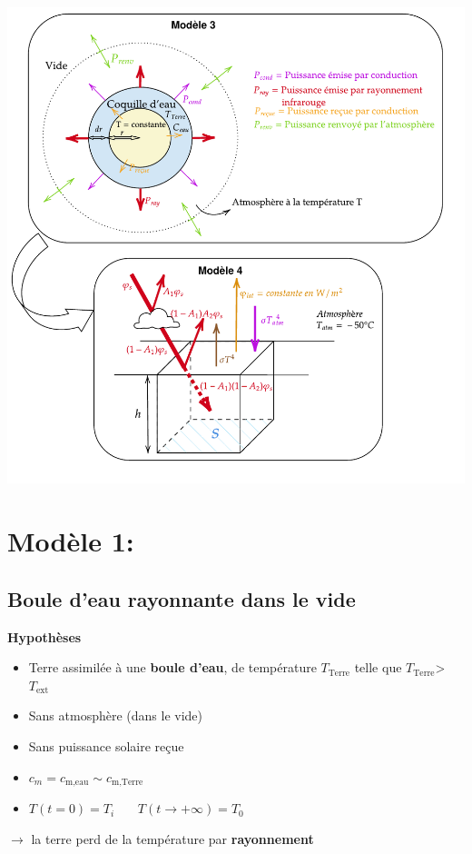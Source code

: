 \documentclass[a4paper,12pt]{article}
\begin{document}
\begin{center}
   \includegraphics[width=1\textwidth, angle=0]{evolution_projet_2.pdf}
\end{center}

\newpage
  
\section{Modèle 1: }
\subsection{Boule d’eau rayonnante dans le vide}
\textbf{Hypothèses}

\begin{itemize}
    \item Terre assimilée à une \textbf{boule d'eau}, de température
    \(T_{\text{Terre}}\) telle que \(T_{\text{Terre}}\)> \(T_{\text{ext}}\)
    \item  Sans atmosphère (dans le vide)
    \item  Sans puissance solaire reçue  
    \item \(c_{m}= c_{\text{m,eau}} \sim c_{\text{m,Terre}}\) 
    \item $T(t=0) = T_i$ \ \ \
$T(t \to +\infty) = T_0$
   
\end{itemize}
$\rightarrow$ la terre perd de la température par \textbf{rayonnement}
\\ 
\end{document}
